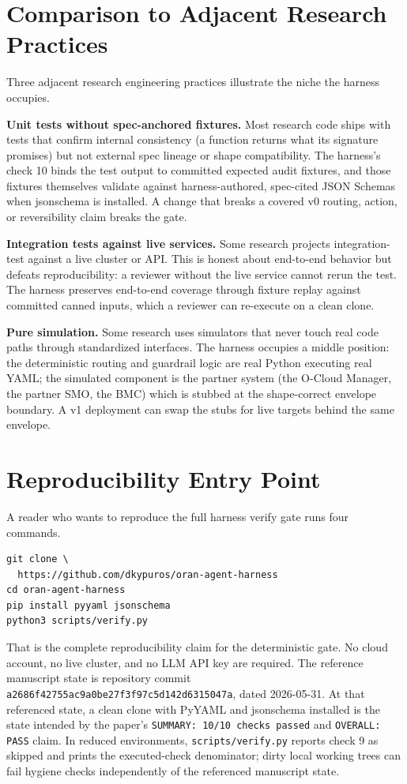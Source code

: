 \documentclass[twocolumn,10pt,a4paper]{article}
\begin{document}
\section{Comparison to Adjacent Research Practices}
\label{sec:compare}

Three adjacent research engineering practices illustrate the niche the harness occupies.

\textbf{Unit tests without spec-anchored fixtures.} Most research code ships with tests that confirm internal consistency (a function returns what its signature promises) but not external spec lineage or shape compatibility. The harness's check 10 binds the test output to committed expected audit fixtures, and those fixtures themselves validate against harness-authored, spec-cited JSON Schemas when jsonschema is installed. A change that breaks a covered v0 routing, action, or reversibility claim breaks the gate.

\textbf{Integration tests against live services.} Some research projects integration-test against a live cluster or API. This is honest about end-to-end behavior but defeats reproducibility: a reviewer without the live service cannot rerun the test. The harness preserves end-to-end coverage through fixture replay against committed canned inputs, which a reviewer can re-execute on a clean clone.

\textbf{Pure simulation.} Some research uses simulators that never touch real code paths through standardized interfaces. The harness occupies a middle position: the deterministic routing and guardrail logic are real Python executing real YAML; the simulated component is the partner system (the O-Cloud Manager, the partner SMO, the BMC) which is stubbed at the shape-correct envelope boundary. A v1 deployment can swap the stubs for live targets behind the same envelope.

\section{Reproducibility Entry Point}
\label{sec:repro}

A reader who wants to reproduce the full harness verify gate runs four commands.

\begin{verbatim}
git clone \
  https://github.com/dkypuros/oran-agent-harness
cd oran-agent-harness
pip install pyyaml jsonschema
python3 scripts/verify.py
\end{verbatim}

That is the complete reproducibility claim for the deterministic gate. No cloud account, no live cluster, and no LLM API key are required. The reference manuscript state is repository commit \texttt{a2686f42755ac9a0be27f3f97c5d142d6315047a}, dated 2026-05-31. At that referenced state, a clean clone with PyYAML and jsonschema installed is the state intended by the paper's \texttt{SUMMARY: 10/10 checks passed} and \texttt{OVERALL: PASS} claim. In reduced environments, \texttt{scripts/verify.py} reports check 9 as skipped and prints the executed-check denominator; dirty local working trees can fail hygiene checks independently of the referenced manuscript state.
\end{document}
